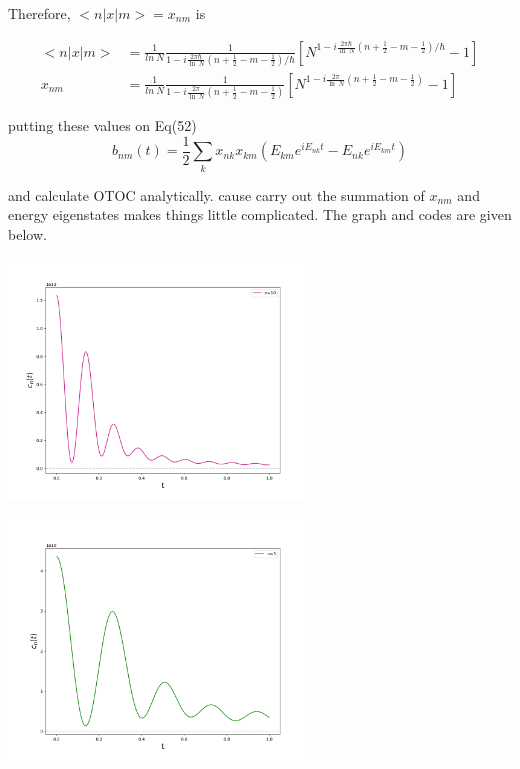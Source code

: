 \documentclass[12pt, letterpaper]{article}
\newcommand*{\1}{\hspace{1pt}}
\begin{document}
        Therefore, $<n|x|m>=x_{nm}$ is

        \begin{align}
            <n|x|m> &= \frac{1}{ln \ N} \frac{1}{1-i\frac{2\pi \hbar}{\ln \ N}(n + \frac{1}{2}-m-\frac{1}{2})/\hbar}\left[N^{1-i\frac{2\pi \hbar}{\ln \ N}(n + \frac{1}{2}-m-\frac{1}{2})/\hbar} - 1\right] \\
            x_{nm}&= \frac{1}{ln \ N} \frac{1}{1-i\frac{2\pi}{\ln \ N}(n + \frac{1}{2}-m-\frac{1}{2})}\left[N^{1-i\frac{2\pi}{\ln \ N}(n + \frac{1}{2}-m-\frac{1}{2})} - 1\right]
        \end{align}

        putting these values on Eq(52)
        \begin{equation*}
            b_{nm}(t) = \frac{1}{2}\sum_{k} x_{nk}x_{km}(E_{km}e^{i E _{nk}t} - E_{nk}e^{iE_{km}t}) 
        \end{equation*}

        and calculate OTOC analytically. cause carry out the summation of $x_{nm}$ and energy eigenstates makes things little complicated. The graph and codes are given below.

        \begin{adjustbox}{center,caption={},label={microcanocnial OTOC},nofloat=figure,}
            \includegraphics[width=0.6\textwidth]{pic1}
        \end{adjustbox}

        \begin{adjustbox}{center,caption={},label={microcanocnial OTOC},nofloat=figure,}
            \includegraphics[width=0.6\textwidth]{pic2}
        \end{adjustbox}
\end{document}
